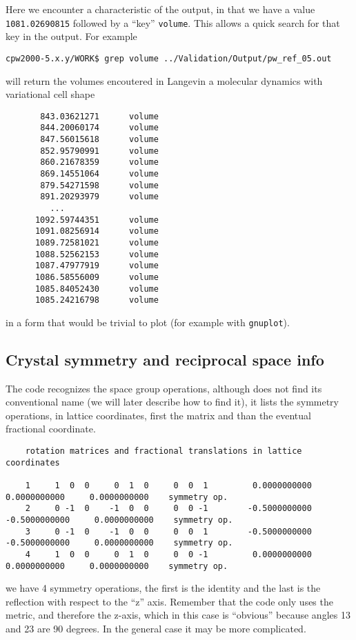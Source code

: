 \documentclass[11pt]{article}
\begin{document}
Here we encounter a characteristic of the output, in that we have a value {\tt 1081.02690815}
followed by a ``key'' {\tt volume}.  This allows a quick search for that key in the output.
For example

\noindent\texttt{cpw2000-5.x.y/WORK\$ grep volume ../Validation/Output/pw\_ref\_05.out}

will return the volumes encoutered in Langevin a molecular dynamics
with variational cell shape
\begin{verbatim}
       843.03621271      volume
       844.20060174      volume
       847.56015618      volume
       852.95790991      volume
       860.21678359      volume
       869.14551064      volume
       879.54271598      volume
       891.20293979      volume
         ...
      1092.59744351      volume
      1091.08256914      volume
      1089.72581021      volume
      1088.52562153      volume
      1087.47977919      volume
      1086.58556009      volume
      1085.84052430      volume
      1085.24216798      volume
\end{verbatim}
in a form that would be trivial to plot (for example with {\tt gnuplot}).

\subsection{Crystal symmetry and reciprocal space info}

The code recognizes the space group operations, although does not
find its conventional name (we will later describe how to find it),
it lists the symmetry operations, in lattice coordinates,
first the matrix and than the eventual fractional coordinate.
\begin{verbatim}
    rotation matrices and fractional translations in lattice coordinates

    1     1  0  0     0  1  0     0  0  1         0.0000000000     0.0000000000     0.0000000000    symmetry op.
    2     0 -1  0    -1  0  0     0  0 -1        -0.5000000000    -0.5000000000     0.0000000000    symmetry op.
    3     0 -1  0    -1  0  0     0  0  1        -0.5000000000    -0.5000000000     0.0000000000    symmetry op.
    4     1  0  0     0  1  0     0  0 -1         0.0000000000     0.0000000000     0.0000000000    symmetry op.
\end{verbatim}
we have 4 symmetry operations, the first is the identity and the last is the reflection with respect
to the ``z'' axis.  Remember that the code only uses the metric, and therefore the z-axis,
which in this case is ``obvious'' because angles 13 and 23 are 90 degrees.
In the general case it may be more complicated.
\end{document}
